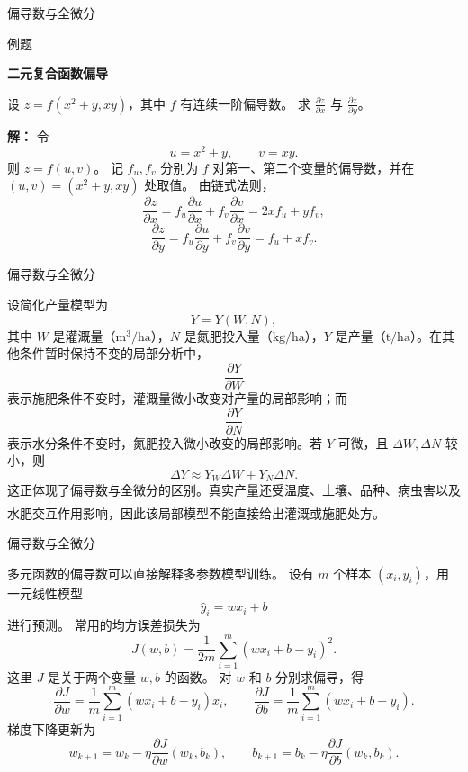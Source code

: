 \documentclass[aspectratio=169,10pt,fontset=fandol]{ctexbeamer}
\newcommand{\upcite}[1]{\textsuperscript{\textsuperscript{\cite{#1}}}}
\begin{document}
\begin{frame}[t,fragile]{偏导数与全微分}
\normalsize
\begin{block}{例题}
{\normalsize
\textbf{二元复合函数偏导}\par

设 $z=f(x^2+y,xy)$，其中 $f$ 有连续一阶偏导数。 求 $\frac{\partial z}{\partial x}$ 与 $\frac{\partial z}{\partial y}$。

}
\end{block}
\pause
{\normalsize
\textbf{解：}
令
\[
u=x^2+y,\qquad v=xy.
\]
则 $z=f(u,v)$。 记 $f_u,f_v$ 分别为 $f$ 对第一、第二个变量的偏导数，并在 $(u,v)=(x^2+y,xy)$ 处取值。 由链式法则，
\[
\frac{\partial z}{\partial x}
=f_u\frac{\partial u}{\partial x}+f_v\frac{\partial v}{\partial x}
=2x f_u+y f_v,
\]
\[
\frac{\partial z}{\partial y}
=f_u\frac{\partial u}{\partial y}+f_v\frac{\partial v}{\partial y}
=f_u+x f_v.
\]

}
\end{frame}
\begin{frame}[t,fragile]{偏导数与全微分}
\normalsize
{\normalsize
\begin{application}[作物产量对水分和氮肥的敏感性]
设简化产量模型为
\[
Y=Y(W,N),
\]
其中 $W$ 是灌溉量（$\mathrm{m^3/ha}$），$N$ 是氮肥投入量（$\mathrm{kg/ha}$），$Y$ 是产量（$\mathrm{t/ha}$）。在其他条件暂时保持不变的局部分析中，
\[
\frac{\partial Y}{\partial W}
\]
表示施肥条件不变时，灌溉量微小改变对产量的局部影响；而
\[
\frac{\partial Y}{\partial N}
\]
表示水分条件不变时，氮肥投入微小改变的局部影响。若 $Y$ 可微，且 $\Delta W,\Delta N$ 较小，则
\[
\Delta Y\approx Y_W\Delta W+Y_N\Delta N.
\]
这正体现了偏导数与全微分的区别。真实产量还受温度、土壤、品种、病虫害以及水肥交互作用影响，因此该局部模型不能直接给出灌溉或施肥处方。\upcite{TaizPlant}
\end{application}
}
\end{frame}
\begin{frame}[t,fragile]{偏导数与全微分}
\footnotesize
{\footnotesize
\begin{application}[偏导数在多参数机器学习模型中的应用]
	
	多元函数的偏导数可以直接解释多参数模型训练。 设有 $m$ 个样本 $(x_i,y_i)$，用一元线性模型
	\[
	\hat y_i=wx_i+b
	\]
	进行预测。 常用的均方误差损失为
	\[
	J(w,b)=\frac{1}{2m}\sum_{i=1}^{m}(wx_i+b-y_i)^2.
	\]
	这里 $J$ 是关于两个变量 $w,b$ 的函数。 对 $w$ 和 $b$ 分别求偏导，得
	\[
	\frac{\partial J}{\partial w}
	=\frac{1}{m}\sum_{i=1}^{m}(wx_i+b-y_i)x_i,
	\qquad
	\frac{\partial J}{\partial b}
	=\frac{1}{m}\sum_{i=1}^{m}(wx_i+b-y_i).
	\]
	梯度下降更新为
	\[
	w_{k+1}=w_k-\eta\frac{\partial J}{\partial w}(w_k,b_k),\qquad
	b_{k+1}=b_k-\eta\frac{\partial J}{\partial b}(w_k,b_k).
	\]
	

\end{application}
}
\end{frame}
\end{document}
